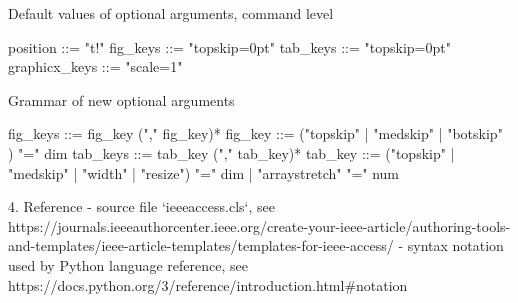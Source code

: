 Default values of optional arguments, command level

  position      ::= "t!"
  fig_keys      ::= "topskip=0pt"
  tab_keys      ::= "topskip=0pt"
  graphicx_keys ::= "scale=1"


Grammar of new optional arguments

  fig_keys  ::= fig_key ("," fig_key)*
  fig_key   ::= ("topskip" | "medskip" | "botskip" ) "=" dim
  tab_keys  ::= tab_key ("," tab_key)*
  tab_key   ::= ("topskip" | "medskip" | "width" | "resize") "=" dim 
              | "arraystretch" "=" num


4. Reference
 - source file `ieeeaccess.cls`, see  https://journals.ieeeauthorcenter.ieee.org/create-your-ieee-article/authoring-tools-and-templates/ieee-article-templates/templates-for-ieee-access/
 - syntax notation used by Python language reference, see https://docs.python.org/3/reference/introduction.html#notation
 